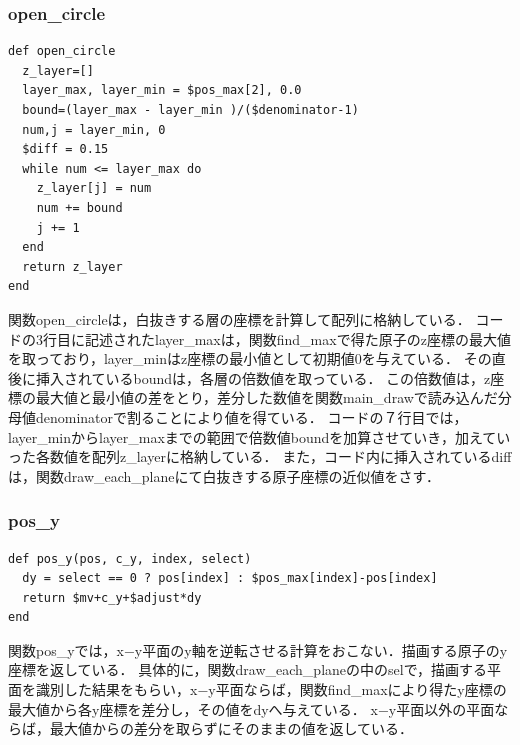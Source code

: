 \subsubsection{open\_circle}\begin{lstlisting}[style=customRuby,basicstyle={\scriptsize\ttfamily}]
def open_circle
  z_layer=[]
  layer_max, layer_min = $pos_max[2], 0.0
  bound=(layer_max - layer_min )/($denominator-1)
  num,j = layer_min, 0
  $diff = 0.15
  while num <= layer_max do
    z_layer[j] = num
    num += bound
    j += 1
  end
  return z_layer
end
\end{lstlisting}
関数open\_circleは，白抜きする層の座標を計算して配列に格納している．
コードの3行目に記述されたlayer\_maxは，関数find\_maxで得た原子のz座標の最大値を取っており，layer\_minはz座標の最小値として初期値0を与えている．
その直後に挿入されているboundは，各層の倍数値を取っている．
この倍数値は，z座標の最大値と最小値の差をとり，差分した数値を関数main\_drawで読み込んだ分母値denominatorで割ることにより値を得ている．
コードの７行目では，layer\_minからlayer\_maxまでの範囲で倍数値boundを加算させていき，加えていった各数値を配列z\_layerに格納している．
また，コード内に挿入されているdiffは，関数draw\_each\_planeにて白抜きする原子座標の近似値をさす．

\subsubsection{pos\_y}\begin{lstlisting}[style=customRuby,basicstyle={\scriptsize\ttfamily}]
def pos_y(pos, c_y, index, select)
  dy = select == 0 ? pos[index] : $pos_max[index]-pos[index]
  return $mv+c_y+$adjust*dy
end
\end{lstlisting}
関数pos\_yでは，x−y平面のy軸を逆転させる計算をおこない．描画する原子のy座標を返している．
具体的に，関数draw\_each\_planeの中のselで，描画する平面を識別した結果をもらい，x−y平面ならば，関数find\_maxにより得たy座標の最大値から各y座標を差分し，その値をdyへ与えている．
x−y平面以外の平面ならば，最大値からの差分を取らずにそのままの値を返している．

